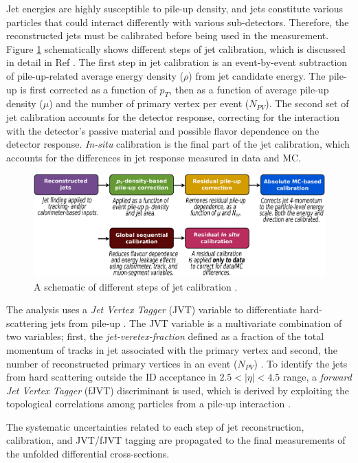 Jet energies are highly susceptible to pile-up density, and jets constitute various particles that could interact differently with various sub-detectors. Therefore, the reconstructed jets must be calibrated before being used in the measurement. Figure \ref{fig:JetCalib} schematically shows different steps of jet calibration, which is discussed in detail in Ref \cite{JetCalib}. The first step in jet calibration is an event-by-event subtraction of pile-up-related average energy density ($\rho$) from jet candidate energy. The pile-up is first corrected as a function of $p_{T}$, then as a function of average pile-up density ($\mu$) and the number of primary vertex per event ($N_{PV}$). The second set of jet calibration accounts for the detector response, correcting for the interaction with the detector's passive material and possible flavor dependence on the detector response. \textit{In-situ} calibration is the final part of the jet calibration, which accounts for the differences in jet response measured in data and MC. 

\begin{figure}
    \centering
    \includegraphics[width=.95\linewidth]{figures/LHC/JetCalib.pdf}
    \caption{ A schematic of different steps of jet calibration \cite{JetCalib}.\label{fig:JetCalib}}
\end{figure}

The analysis uses a \textit{Jet Vertex Tagger} (JVT) variable to differentiate hard-scattering jets from pile-up \cite{JVT}. The JVT variable is a multivariate combination of two variables; first, the \textit{jet-veretex-fraction} defined as a fraction of the total momentum of tracks in jet associated with the primary vertex and second, the number of reconstructed primary vertices in an event ($N_{PV}$) \cite{JVT}. To identify the jets from hard scattering outside the ID acceptance in $2.5<|\eta|<4.5$ range, a \textit{forward Jet Vertex Tagger} (fJVT) discriminant is used, which is derived by exploiting the topological correlations among particles from a pile-up interaction \cite{fJVT}. 

The systematic uncertainties related to each step of jet reconstruction, calibration, and JVT/fJVT tagging are propagated to the final measurements of the unfolded differential cross-sections.  
